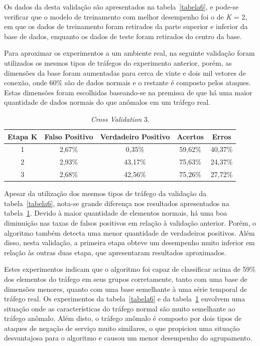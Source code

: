 \indent Os dados da desta validação são apresentados na tabela~\ref{tabela6}, e pode-se verificar que o modelo de treinamento com melhor desempenho foi o de \textit{K} = 2, em que os dados de treinamento foram retirados da parte superior e inferior da base de dados, enquanto os dados de teste foram retirados do centro da base.

\indent Para aproximar os experimentos a um ambiente real, na seguinte validação foram utilizados os mesmos tipos de tráfegos do experimento anterior, porém, as dimensões da base foram aumentadas  para cerca de vinte e dois mil vetores de conexão, onde 60\% são de dados normais e o restante é composto pelos ataques. Estas dimensões foram escolhidas baseando-se na premissa de que há uma maior quantidade de dados normais do que anômalos em um tráfego real.

\begin{table}[h]
\centering
\caption{\textit{Cross Validation} 3.}
\label{tabela7}
\vspace{0.5cm}
\begin{tabular}{|c|c|c|c|c|}
\hline
\textbf{Etapa K} & \textbf{Falso Positivo} & \textbf{Verdadeiro Positivo} & \textbf{Acertos} & \textbf{Erros}\\
\hline
1 & 2,67\% & 0,35\% & 59,62\% & 40,37\% \\
\hline
2 & 2,93\% & 43,17\% & 75,63\% & 24,37\%\\
\hline
3 & 2,68\% & 42,56\% & 75,26\% & 27,72\%\\
\hline
\end{tabular}
\end{table}

\indent Apesar da utilização dos mesmos tipos de tráfego da validação da tabela~\ref{tabela6}, nota-se grande diferença nos resultados apresentados na tabela~\ref{tabela7}. Devido à maior quantidade de elementos normais, há uma boa diminuição nas taxas de falsos positivos em relação à validação anterior. Porém, o algoritmo também detecta uma menor quantidade de verdadeiros positivos. Além disso, nesta validação, a primeira etapa obteve um desempenho muito inferior em relação às outras duas etapa, que apresentaram resultados aproximados.

\indent Estes experimentos indicam que o algoritmo foi capaz de classificar acima de 59\% dos elementos do tráfego em seus grupos corretamente, tanto com uma base de dimensões menores, quanto com uma base semelhante à uma série temporal de tráfego real. Os experimentos da tabela~\ref{tabela6} e da tabela~\ref{tabela7} envolvem uma situação onde as características do tráfego normal são muito semelhante ao tráfego anômalo. Além disto, o tráfego anômalo é composto por dois tipos de ataques de negação de serviço muito similares, o que propiciou uma situação desvantajosa para o algoritmo e causou um menor desempenho do agrupamento.





